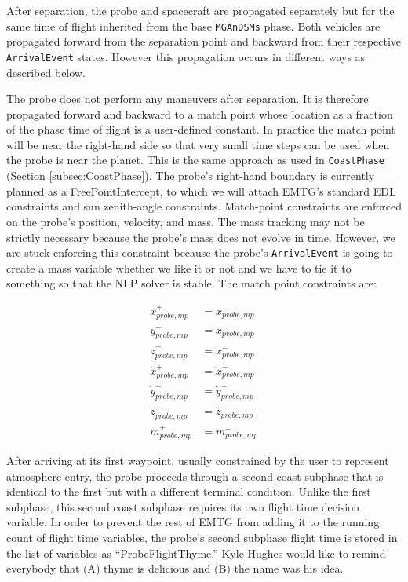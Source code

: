 After separation, the probe and spacecraft are propagated separately but for the same time of flight inherited from the base \texttt{MGAnDSMs} phase. Both vehicles are propagated forward from the separation point and backward from their respective \texttt{ArrivalEvent} states. However this propagation occurs in different ways as described below.

The probe does not perform any maneuvers after separation. It is therefore propagated forward and backward to a match point whose location as a fraction of the phase time of flight is a user-defined constant. In practice the match point will be near the right-hand side so that very small time steps can be used when the probe is near the planet. This is the same approach as used in \texttt{CoastPhase} (Section \ref{subsec:CoastPhase}). The probe's right-hand boundary is currently planned as a FreePointIntercept, to which we will attach \ac{EMTG}'s standard \ac{EDL} constraints and sun zenith-angle constraints. Match-point constraints are enforced on the probe's position, velocity, and mass. The mass tracking may not be strictly necessary because the probe's mass does not evolve in time. However, we are stuck enforcing this constraint because the probe's \texttt{ArrivalEvent} is going to create a mass variable whether we like it or not and we have to tie it to something so that the \ac{NLP} solver is stable. The match point constraints are:

\begin{align}
x_{probe,mp}^+ &= x_{probe,mp}^-\\
y_{probe,mp}^+ &= x_{probe,mp}^-\\
z_{probe,mp}^+ &= x_{probe,mp}^-\\
\dot x_{probe,mp}^+ &= \dot x_{probe,mp}^-\\
\dot y_{probe,mp}^+ &= \dot y_{probe,mp}^-\\
\dot z_{probe,mp}^+ &= \dot z_{probe,mp}^-\\	
m_{probe,mp}^+ &= m_{probe,mp}^-	
\end{align}

After arriving at its first waypoint, usually constrained by the user to represent atmosphere entry, the probe proceeds through a second coast subphase that is identical to the first but with a different terminal condition. Unlike the first subphase, this second coast subphase requires its own flight time decision variable. In order to prevent the rest of \ac{EMTG} from adding it to the running count of flight time variables, the probe's second subphase flight time is stored in the list of variables as ``ProbeFlightThyme.'' Kyle Hughes would like to remind everybody that (A) thyme is delicious and (B) the name was his idea.

